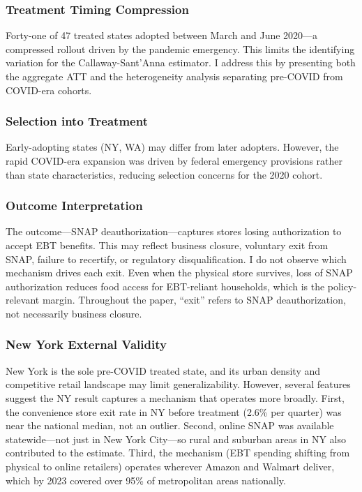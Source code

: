 \documentclass[12pt]{article}
\begin{document}
\subsubsection*{Treatment Timing Compression} Forty-one of 47 treated states adopted between March and June 2020---a compressed rollout driven by the pandemic emergency. This limits the identifying variation for the Callaway-Sant'Anna estimator. I address this by presenting both the aggregate ATT and the heterogeneity analysis separating pre-COVID from COVID-era cohorts.

\subsubsection*{Selection into Treatment} Early-adopting states (NY, WA) may differ from later adopters. However, the rapid COVID-era expansion was driven by federal emergency provisions rather than state characteristics, reducing selection concerns for the 2020 cohort.

\subsubsection*{Outcome Interpretation} The outcome---SNAP deauthorization---captures stores losing authorization to accept EBT benefits. This may reflect business closure, voluntary exit from SNAP, failure to recertify, or regulatory disqualification. I do not observe which mechanism drives each exit. Even when the physical store survives, loss of SNAP authorization reduces food access for EBT-reliant households, which is the policy-relevant margin. Throughout the paper, ``exit'' refers to SNAP deauthorization, not necessarily business closure.

\subsubsection*{New York External Validity} New York is the sole pre-COVID treated state, and its urban density and competitive retail landscape may limit generalizability. However, several features suggest the NY result captures a mechanism that operates more broadly. First, the convenience store exit rate in NY before treatment (2.6\% per quarter) was near the national median, not an outlier. Second, online SNAP was available statewide---not just in New York City---so rural and suburban areas in NY also contributed to the estimate. Third, the mechanism (EBT spending shifting from physical to online retailers) operates wherever Amazon and Walmart deliver, which by 2023 covered over 95\% of metropolitan areas nationally.
\end{document}
